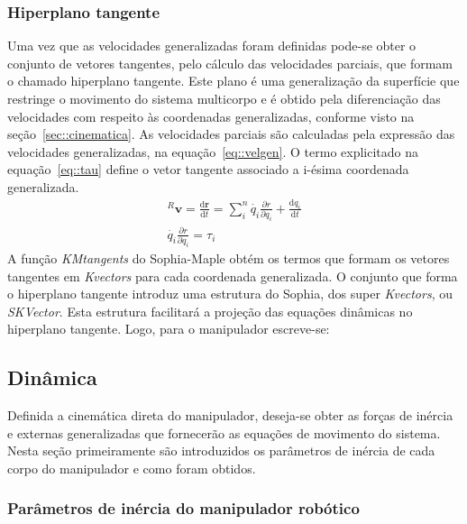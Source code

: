 \subsubsection{Hiperplano tangente}

Uma vez que as velocidades generalizadas foram definidas pode-se obter o
conjunto de vetores tangentes, pelo cálculo das velocidades parciais, que formam
o chamado hiperplano tangente.
Este plano é uma generalização da superfície que restringe o movimento do
sistema multicorpo e é obtido pela diferenciação das velocidades com respeito
às coordenadas generalizadas, conforme visto na seção~\ref{sec::cinematica}. As
velocidades parciais são calculadas pela expressão das velocidades
generalizadas, na equação~\ref{eq::velgen}. O termo explicitado na
equação~\ref{eq::tau} define o vetor tangente associado a i-ésima coordenada
generalizada.
%
\begin{gather}
	^{R}\mathbf{v} = \frac{\mathrm{d} \mathbf{r}}{\mathrm{d} t} = \sum_{i}^{n}
	\dot{q_{i}} \frac{\partial r}{\partial q_{i}} + \frac{\mathrm{d}
	q_{i}}{\mathrm{d} t} \label{eq::velgen}\\
	\dot{q_{i}} \frac{\partial r}{\partial q_{i}} = \tau_{i} \label{eq::tau}
\end{gather}
%
A função \textit{KMtangents} do Sophia-Maple obtém os termos que formam os
vetores tangentes em \textit{Kvectors} para cada coordenada generalizada. O
conjunto que forma o hiperplano tangente introduz uma estrutura do Sophia, dos
super \textit{Kvectors}, ou \textit{SKVector}. Esta estrutura facilitará a
projeção das equações dinâmicas no hiperplano tangente. Logo, para o manipulador
escreve-se:

\medskip {} \medskip 


\subsection{Dinâmica}

Definida a cinemática direta do manipulador, deseja-se obter as forças de
inércia e externas generalizadas que fornecerão as equações de movimento do
sistema. Nesta seção primeiramente são introduzidos os parâmetros de inércia de
cada corpo do manipulador e como foram obtidos.

\subsubsection{Parâmetros de inércia do manipulador robótico}

